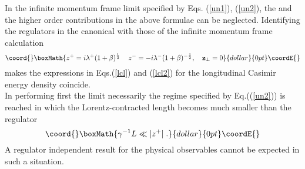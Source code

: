 \documentclass[a4paper,twocolumn,eqsecnum,aps]{revtex4}
\begin{document}
In the infinite momentum frame limit specified by Eqs. (\ref{un1}), (\ref{un2}), the \coordHE{}  and the higher order contributions in the above formulae can be neglected. Identifying the regulators in the canonical with those of the infinite momentum frame calculation
$$\coord{}\boxMath{ z^{+}= i\lambda^{+}(1+\beta)^{\frac{1}{2}}\,\quad z^{-} = -i\lambda^{-}(1+\beta)^{-\frac{1}{2}},\quad {\bf z}_{\perp}=0}{dollar}{0pt}\coordE{}$$ 
makes the  expressions in Eqs.(\ref{lcl}) and (\ref{lcl2}) for the longitudinal Casimir energy density coincide.  \\
In performing first the limit \coordHE{}   necessarily  the regime specified by  Eq.((\ref{un2})) is reached in which the Lorentz-contracted length becomes much smaller than the regulator 
$$\coord{}\boxMath{ \gamma^{-1} L \ll |z^{+}| \;.}{dollar}{0pt}\coordE{}$$ 
A regulator independent result for the physical observables cannot be expected in such a situation.


\end{document}
